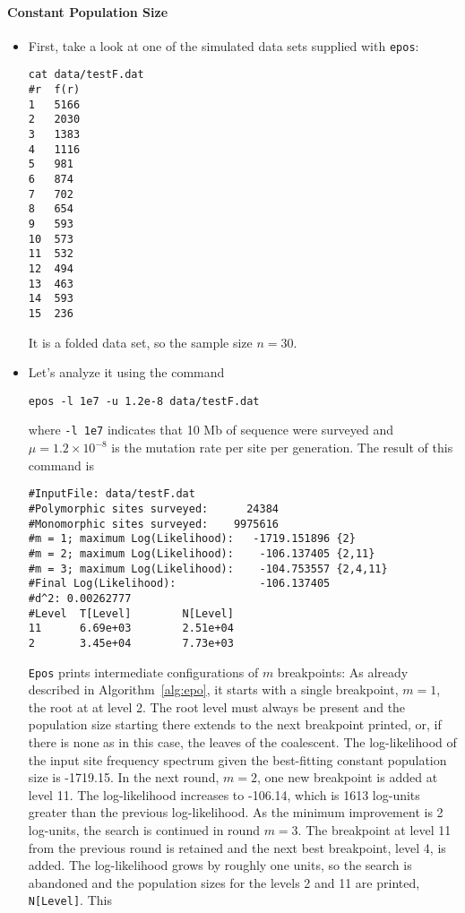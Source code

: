 \documentclass[a4paper, english]{article}
\newcommand{\ty}{\texttt}
\begin{document}
\paragraph{Constant Population Size}
\begin{itemize}
\item First, take a look at one of the simulated data sets supplied
  with \ty{epos}:
\begin{verbatim}
cat data/testF.dat 
#r	f(r)
1	5166
2	2030
3	1383
4	1116
5	981
6	874
7	702
8	654
9	593
10	573
11	532
12	494
13	463
14	593
15	236
\end{verbatim}
It is a folded data set, so the sample size $n=30$.
\item Let's analyze it using the command
\begin{verbatim}
epos -l 1e7 -u 1.2e-8 data/testF.dat 
\end{verbatim}
where \ty{-l 1e7} indicates that 10 Mb of sequence were surveyed and
$\mu=1.2\times 10^{-8}$ is the mutation rate per site per generation. The result of this command is
\begin{verbatim}
#InputFile: data/testF.dat
#Polymorphic sites surveyed:      24384
#Monomorphic sites surveyed:    9975616
#m = 1; maximum Log(Likelihood):   -1719.151896 {2}
#m = 2; maximum Log(Likelihood):    -106.137405 {2,11}
#m = 3; maximum Log(Likelihood):    -104.753557 {2,4,11}
#Final Log(Likelihood):             -106.137405
#d^2: 0.00262777
#Level  T[Level]        N[Level]
11      6.69e+03        2.51e+04
2       3.45e+04        7.73e+03
\end{verbatim}
\ty{Epos} prints intermediate configurations of $m$ breakpoints: As
already described in Algorithm~\ref{alg:epo}, it starts with a single
breakpoint, $m=1$, the root at at level 2. The root level must always
be present and the population size starting there extends to the next
breakpoint printed, or, if there is none as in this case, the leaves
of the coalescent. The log-likelihood of the input site frequency
spectrum given the best-fitting constant population size is
-1719.15. In the next round, $m=2$, one new breakpoint is added at
level 11. The log-likelihood increases to -106.14, which is 
1613 log-units greater than the previous log-likelihood. As the minimum
improvement is 2 log-units, the search is continued in round
$m=3$. The breakpoint at level 11 from the previous round is retained
and the next best breakpoint, level 4, is added. The log-likelihood
grows by roughly one units, so the search is abandoned and the
population sizes for the levels 2 and 11 are printed, \ty{N[Level]}. This

\end{itemize}
\end{document}
